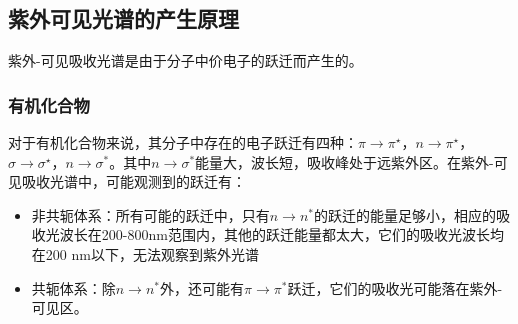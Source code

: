 \subsection{紫外可见光谱的产生原理}
紫外-可见吸收光谱是由于分子中价电子的跃迁而产生的。
\subsubsection*{有机化合物}
对于有机化合物来说，其分子中存在的电子跃迁有四种：$\pi \rightarrow \pi^{\star}$，$n\rightarrow \pi^{\star}$，$\sigma \rightarrow  \sigma^{\star}$，$n\rightarrow \sigma^{*}$。其中$n\rightarrow\sigma^{*}$能量大，波长短，吸收峰处于远紫外区。在紫外-可见吸收光谱中，可能观测到的跃迁有：
\begin{itemize}
    \item 非共轭体系：所有可能的跃迁中，只有$n\rightarrow n^{*}$的跃迁的能量足够小，相应的吸收光波长在200-800$ \mathrm{nm}$范围内，其他的跃迁能量都太大，它们的吸收光波长均在200 $\mathrm{nm}$以下，无法观察到紫外光谱
    \item 共轭体系：除$n\rightarrow n^{*}$外，还可能有$\pi \rightarrow \pi^{*}$跃迁，它们的吸收光可能落在紫外-可见区。
\end{itemize}
